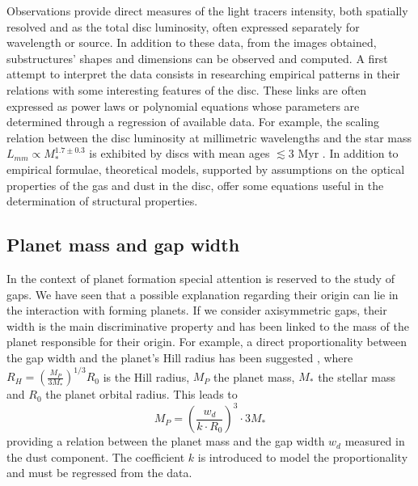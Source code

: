 \documentclass[a4paper,10pt]{report}
\begin{document}

Observations provide direct measures of the light tracers intensity, both spatially resolved and as
the total disc luminosity, often expressed separately for wavelength or source.
In addition to these data, from the images obtained, substructures' shapes and
dimensions can be observed and computed.
A first attempt to interpret the data consists in researching empirical patterns in their relations with some
interesting features of the disc. These links are often expressed as power laws or polynomial equations whose parameters are
determined through a regression of available data.
For example, the scaling relation between the disc luminosity at millimetric wavelengths and the star mass $L_{mm} \propto M_*^{1.7\pm0.3}$
is exhibited by discs with mean ages $\lesssim 3$ Myr \cite[p. 13]{disc_rev}.
In addition to empirical formulae, theoretical models, supported by assumptions on
the optical properties of the gas and dust in the disc, offer some equations useful
in the determination of structural properties.

\subsection{Planet mass and gap width}

In the context of planet formation special attention is reserved to the study of gaps. 
We have seen that a possible explanation regarding their origin can lie in the interaction with
forming planets. If we consider axisymmetric gaps, their width is the main discriminative property and
has been linked to the mass of the planet responsible for their origin.
For example, a direct proportionality between the gap width and the planet's Hill radius has been suggested \cite{Lodato_2019}, where
$
    R_H = (\frac{M_P}{3M_*})^{1/3}R_0
$
is the Hill radius, $M_P$ the planet mass, $M_*$ the stellar mass and $R_0$ the planet orbital radius.
This leads to 
\begin{equation}
    M_P = (\frac{w_d}{k\cdot R_0})^3\cdot 3M_*
\end{equation}
providing a relation between the planet mass and the gap width $w_d$ measured in the dust component.
The coefficient $k$ is introduced to model the proportionality and must be regressed from the data.
\end{document}

